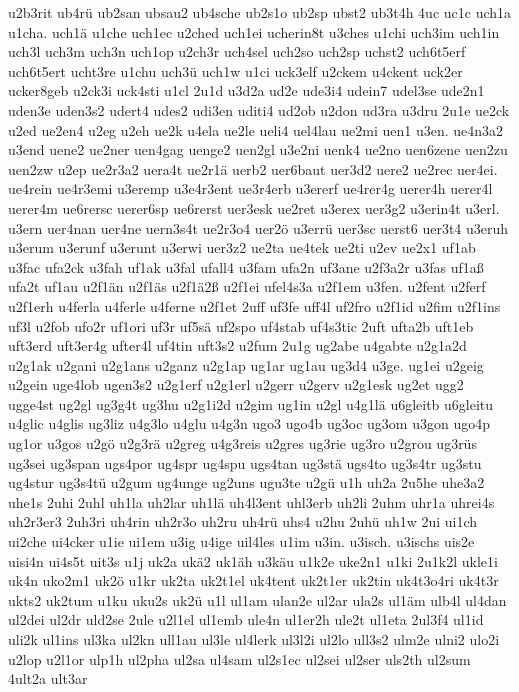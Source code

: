 {u2b3rit
ub4rü
ub2san
ubsau2
ub4sche
ub2s1o
ub2sp
ubst2
ub3t4h
4uc
uc1c
uch1a
u1cha.
uch1ä
u1che
uch1ec
u2ched
uch1ei
ucherin8t
u3ches
u1chi
uch3im
uch1in
uch3l
uch3m
uch3n
uch1op
u2ch3r
uch4sel
uch2so
uch2sp
uchst2
uch6t5erf
uch6t5ert
ucht3re
u1chu
uch3ü
uch1w
u1ci
uck3elf
u2ckem
u4ckent
uck2er
ucker8geb
u2ck3i
uck4sti
u1cl
2u1d
u3d2a
ud2e
ude3i4
udein7
udel3se
ude2n1
uden3e
uden3s2
udert4
udes2
udi3en
uditi4
ud2ob
u2don
ud3ra
u3dru
2u1e
ue2ck
u2ed
ue2en4
u2eg
u2eh
ue2k
u4ela
ue2le
ueli4
uel4lau
ue2mi
uen1
u3en.
ue4n3a2
u3end
uene2
ue2ner
uen4gag
uenge2
uen2gl
u3e2ni
uenk4
ue2no
uen6zene
uen2zu
uen2zw
u2ep
ue2r3a2
uera4t
ue2r1ä
uerb2
uer6baut
uer3d2
uere2
ue2rec
uer4ei.
ue4rein
ue4r3emi
u3eremp
u3e4r3ent
ue3r4erb
u3ererf
ue4rer4g
uerer4h
uerer4l
uerer4m
ue6rersc
uerer6sp
ue6rerst
uer3esk
ue2ret
u3erex
uer3g2
u3erin4t
u3erl.
u3ern
uer4nan
uer4ne
uern3s4t
ue2r3o4
uer2ö
u3errü
uer3sc
uerst6
uer3t4
u3eruh
u3erum
u3erunf
u3erunt
u3erwi
uer3z2
ue2ta
ue4tek
ue2ti
u2ev
ue2x1
uf1ab
u3fac
ufa2ck
u3fah
uf1ak
u3fal
ufall4
u3fam
ufa2n
uf3ane
u2f3a2r
u3fas
uf1aß
ufa2t
uf1au
u2f1än
u2f1äs
u2f1ä2ß
u2f1ei
ufel4s3a
u2f1em
u3fen.
u2fent
u2ferf
u2f1erh
u4ferla
u4ferle
u4ferne
u2f1et
2uff
uf3fe
uff4l
uf2fro
u2f1id
u2fim
u2f1ins
uf3l
u2fob
ufo2r
uf1ori
uf3r
uf5sä
uf2spo
uf4stab
uf4s3tic
2uft
ufta2b
uft1eb
uft3erd
uft3er4g
ufter4l
uf4tin
uft3s2
u2fum
2u1g
ug2abe
u4gabte
u2g1a2d
u2g1ak
u2gani
u2g1ans
u2ganz
u2g1ap
ug1ar
ug1au
ug3d4
u3ge.
ug1ei
u2geig
u2gein
uge4lob
ugen3s2
u2g1erf
u2g1erl
u2gerr
u2gerv
u2g1esk
ug2et
ugg2
ugge4st
ug2gl
ug3g4t
ug3hu
u2g1i2d
u2gim
ug1in
u2gl
u4g1lä
u6gleitb
u6gleitu
u4glic
u4glis
ug3liz
u4g3lo
u4glu
u4g3n
ugo3
ugo4b
ug3oc
ug3om
u3gon
ugo4p
ug1or
u3gos
u2gö
u2g3rä
u2greg
u4g3reis
u2gres
ug3rie
ug3ro
u2grou
ug3rüs
ug3sei
ug3span
ugs4por
ug4spr
ug4spu
ugs4tan
ug3stä
ugs4to
ug3s4tr
ug3stu
ug4stur
ug3s4tü
u2gum
ug4unge
ug2uns
ugu3te
u2gü
u1h
uh2a
2u5he
uhe3a2
uhe1s
2uhi
2uhl
uh1la
uh2lar
uh1lä
uh4l3ent
uhl3erb
uh2li
2uhm
uhr1a
uhrei4s
uh2r3er3
2uh3ri
uh4rin
uh2r3o
uh2ru
uh4rü
uhs4
u2hu
2uhü
uh1w
2ui
ui1ch
ui2che
ui4cker
u1ie
ui1em
u3ig
u4ige
uil4les
u1im
u3in.
u3isch.
u3ischs
uis2e
uisi4n
ui4s5t
uit3s
u1j
uk2a
ukä2
uk1äh
u3käu
u1k2e
uke2n1
u1ki
2u1k2l
ukle1i
uk4n
uko2m1
uk2ö
u1kr
uk2ta
uk2t1el
uk4tent
uk2t1er
uk2tin
uk4t3o4ri
uk4t3r
ukts2
uk2tum
u1ku
uku2s
uk2ü
u1l
ul1am
ulan2e
ul2ar
ula2s
ul1äm
ulb4l
ul4dan
ul2dei
ul2dr
uld2se
2ule
u2l1el
ul1emb
ule4n
ul1er2h
ule2t
ul1eta
2ul3f4
ul1id
uli2k
ul1ins
ul3ka
ul2kn
ull1au
ul3le
ul4lerk
ul3l2i
ul2lo
ull3s2
ulm2e
ulni2
ulo2i
u2lop
u2l1or
ulp1h
ul2pha
ul2sa
ul4sam
ul2s1ec
ul2sei
ul2ser
uls2th
ul2sum
4ult2a
ult3ar
}
